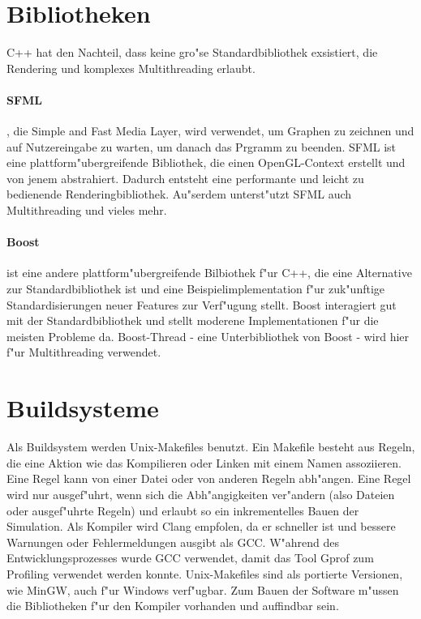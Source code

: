 \documentclass[14pt, a4paper]{report}
\begin{document}
\section{Bibliotheken}
C++ hat den Nachteil, dass keine gro"se Standardbibliothek exsistiert, 
die Rendering und komplexes Multithreading erlaubt.

\paragraph{SFML}, die Simple and Fast Media Layer, wird verwendet, um Graphen zu 
zeichnen und auf Nutzereingabe zu warten, um danach das Prgramm zu beenden. SFML
ist eine plattform"ubergreifende Bibliothek, die einen OpenGL-Context erstellt und von
jenem abstrahiert. Dadurch entsteht eine performante und leicht zu bedienende 
Renderingbibliothek. Au"serdem unterst"utzt SFML auch Multithreading und vieles mehr.

\paragraph{Boost} ist eine andere plattform"ubergreifende Bilbiothek f"ur C++, die eine
Alternative zur Standardbibliothek ist und eine Beispielimplementation f"ur zuk"unftige 
Standardisierungen neuer Features zur Verf"ugung stellt. Boost interagiert gut mit der 
Standardbibliothek und stellt moderene Implementationen f"ur
die meisten Probleme da. Boost-Thread - eine Unterbibliothek von Boost -
wird hier f"ur Multithreading verwendet.

\section{Buildsysteme}
Als Buildsystem werden Unix-Makefiles benutzt. Ein Makefile besteht aus Regeln, die eine
Aktion wie das Kompilieren oder Linken mit einem Namen assoziieren. Eine Regel kann von
einer Datei oder von anderen Regeln abh"angen. Eine Regel wird nur ausgef"uhrt, wenn 
sich die Abh"angigkeiten ver"andern (also Dateien oder ausgef"uhrte Regeln) und erlaubt
so ein inkrementelles Bauen
der Simulation. Als Kompiler wird Clang empfolen, da er schneller ist und bessere
Warnungen oder Fehlermeldungen ausgibt als GCC. W"ahrend des Entwicklungsprozesses 
wurde GCC verwendet, damit das Tool Gprof zum Profiling verwendet werden konnte.
Unix-Makefiles sind als portierte Versionen, wie MinGW, auch f"ur Windows verf"ugbar. 
Zum Bauen
der Software m"ussen die Bibliotheken f"ur den Kompiler vorhanden und auffindbar sein.
\end{document}
